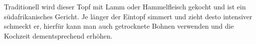 \begin{recipe}
{    }
    
    \suggestion
    {%
           Traditionell wird dieser Topf mit Lamm oder Hammelfleisch gekocht und ist ein südafrikanisches Gericht. Je länger der Eintopf simmert und zieht desto intensiver schmeckt er, hierfür kann man auch getrocknete Bohnen verwenden und die Kochzeit dementsprechend erhöhen. 
    }
    
    
    
\end{recipe}